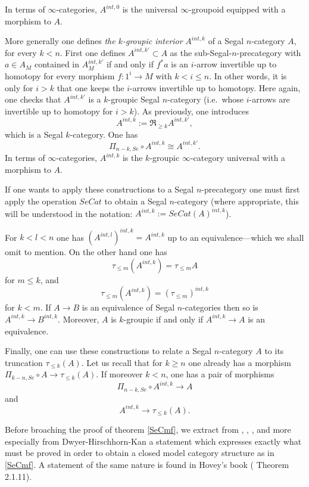 In terms of $\infty$-categories,
$A^{int, 0}$ is the universal $\infty$-groupoid equipped with a morphism to
$A$.


More generally one defines {\em the $k$-groupic interior}
$A^{int, k}$ of a Segal $n$-category $A$, for every $k<n$. First one
defines $A^{int, k'}\subset A$ as the sub-Segal-$n$-precategory with
$a\in A_M$ contained in $A^{int, k'}_M$ if and only if $f^{\ast}a$
is an $i$-arrow invertible up to homotopy for every morphism $f:
1^i\rightarrow M$ with $k<i\leq n$. In other words, it is only
for $i>k$ that one keeps the
$i$-arrows invertible up to homotopy. Here again, one checks that
$A^{int, k'}$ is a $k$-groupic Segal $n$-category (i.e.\ whose
$i$-arrows are invertible up to homotopy for $i>k$). As
previously, one introduces
$$
A^{int, k}:= \Re _{\geq k} A^{int, k'},
$$
which is a Segal $k$-category. One has
$$
\Pi _{n-k,Se}\circ A^{int, k} \cong A^{int, k'}.
$$
In terms of $\infty$-categories,  $A^{int, k}$ is the
$k$-groupic $\infty$-category universal with a morphism to $A$.

If one wants to apply these constructions to a Segal $n$-precategory one must
first apply the operation $SeCat$ to obtain a Segal $n$-category
(where appropriate, this will be understood in the notation:
$A^{int, k}:= SeCat(A)^{int, k}$).

For $k<l<n$ one has $(A^{int, l})^{int, k}=A^{int , k}$ up to an
equivalence---which we shall omit to mention. On the other hand one has
$$
\tau _{\leq m}(A^{int, k})=\tau _{\leq m} A
$$
for $m\leq k$, and
$$
\tau _{\leq m} (A^{int, k})=(\tau _{\leq m})^{int, k}
$$
for $k<m$.
If $A\rightarrow B$ is an equivalence of Segal $n$-categories then so
is $A^{int, k}\rightarrow B^{int , k}$. Moreover, $A$ is
$k$-groupic if and only if $A^{int, k}\rightarrow A$ is an
equivalence.

Finally, one can use these constructions to relate a Segal $n$-category
$A$ to its truncation $\tau _{\leq k}(A)$. Let us recall that for $k\geq n$
one already has a morphism $\Pi _{k-n,Se}\circ A\rightarrow \tau _{\leq
k}(A)$. If moreover $k<n$, one has a pair of morphisms
$$
\Pi _{n-k,Se} \circ A^{int, k} \rightarrow A
$$
and
$$
A^{int, k} \rightarrow \tau _{\leq k}(A).
$$





Before broaching the proof of theorem \ref{SeCmf},
we extract from \cite{Jardine}, \cite{JardineGoerssBook},
\cite{Hirschhorn}, and more especially from Dwyer-Hirschhorn-Kan \cite{DHK} a
statement which expresses exactly what must be proved in order to obtain a
closed model category structure as in \ref{SeCmf}. A statement of the same
nature is found in Hovey's book (\cite{HoveyBook}
Theorem 2.1.11).


